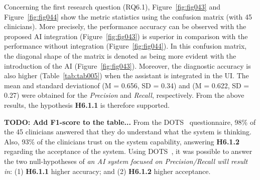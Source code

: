 Concerning the first research question (RQ6.1), Figure~\ref{fig:fig043} and Figure~\ref{fig:fig044} show the metric statistics using the confusion matrix (with 45 clinicians).
More precisely, the performance accuracy can be observed with the proposed \ac{AI} integration (Figure~\ref{fig:fig043}) is superior in comparison with the performance without integration (Figure~\ref{fig:fig044}).
In this confusion matrix, the diagonal shape of the matrix is denoted as being more evident with the introduction of the \ac{AI} (Figure~\ref{fig:fig043}).
Moreover, the diagnostic accuracy is also higher (Table~\ref{tab:tab005}) when the assistant is integrated in the \ac{UI}.
The mean and standard deviation\footnotemark[40] of (M = 0.656, SD = 0.34) and 
(M = 0.622, SD = 0.27) were obtained for the {\it Precision} and {\it Recall}, respectively.
From the above results, the hypothesis {\bf H6.1.1} is therefore supported.




{\bf TODO: Add F1-score to the table...} From the \ac{DOTS}~\cite{https://doi.org/10.13140/RG.2.2.23078.37448/1} questionnaire\footnotemark[41], 98\% of the 45 clinicians answered that they do understand what the system is thinking.
Also, 93\% of the clinicians trust on the system capability, answering {\bf H6.1.2} regarding the acceptance of the system.
Using \ac{DOTS}~\cite{10.1145/2898375.2898385}, it was possible to answer the two null-hypotheses of {\it an \ac{AI} system focused on Precision/Recall will result in}: (1) {\bf H6.1.1} higher accuracy; and (2) {\bf H6.1.2} higher acceptance.


